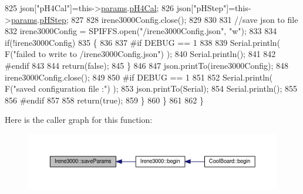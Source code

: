 \begin{DoxyCode}
825             json[\textcolor{stringliteral}{"pH4Cal"}]=this->\hyperlink{class_irene3000_a136585a5ee7f9ac6ab52175fa153f8e3}{params}.\hyperlink{struct_irene3000_1_1parameters___t_a1144de6fb54eb3e1dd2a3d8c2afc97dc}{pH4Cal};
826             json[\textcolor{stringliteral}{"pHStep"}]=this->\hyperlink{class_irene3000_a136585a5ee7f9ac6ab52175fa153f8e3}{params}.\hyperlink{struct_irene3000_1_1parameters___t_a61cfcc2539d5f630e9071f3753aba9fe}{pHStep};         
827             
828             irene3000Config.close();
829             
830             
831             \textcolor{comment}{//save json to file}
832             irene3000Config = SPIFFS.open(\textcolor{stringliteral}{"/irene3000Config.json"}, \textcolor{stringliteral}{"w"});
833 
834             \textcolor{keywordflow}{if}(!irene3000Config)
835             \{
836             
837 \textcolor{preprocessor}{            #if DEBUG == 1}
838 
839                 Serial.println( F(\textcolor{stringliteral}{"failed to write to /irene3000Config.json"}) );
840                 Serial.println();
841             
842 \textcolor{preprocessor}{            #endif }
843 
844                 \textcolor{keywordflow}{return}(\textcolor{keyword}{false});
845             \}
846 
847             json.printTo(irene3000Config);
848             irene3000Config.close();
849             
850 \textcolor{preprocessor}{        #if DEBUG == 1 }
851 
852             Serial.println( F(\textcolor{stringliteral}{"saved configuration file :"})  );
853             json.printTo(Serial);
854             Serial.println();
855         
856 \textcolor{preprocessor}{        #endif}
857 
858             \textcolor{keywordflow}{return}(\textcolor{keyword}{true}); 
859         \}
860     \}   
861 
862 \}
\end{DoxyCode}
Here is the caller graph for this function\+:\nopagebreak
\begin{figure}[H]
\begin{center}
\leavevmode
\includegraphics[width=350pt]{d6/d03/class_irene3000_a63dbd38e79b8cd5f1fba4b245501a894_icgraph}
\end{center}
\end{figure}
\mbox{\label{class_irene3000_aff7c5da186b388e7272e63ff88a20c34}} 
